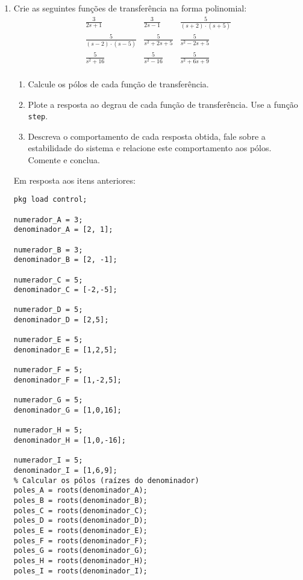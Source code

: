 \documentclass[a4paper,12pt]{article}
\begin{document}
    \begin{enumerate}
        \item Crie as seguintes funções de transferência na forma polinomial:
        \[
            \begin{array}{ccc}
                \frac{3}{2s + 1} & \frac{3}{2s - 1} & \frac{5}{(s + 2) \cdot (s + 5)} \\
                \frac{5}{(s - 2) \cdot (s - 5)} & \frac{5}{s^2 + 2s + 5} & \frac{5}{s^2 - 2s + 5} \\
                \frac{5}{s^2 + 16} & \frac{5}{s^2 - 16} & \frac{5}{s^2 + 6s + 9} \\
            \end{array}
        \]

        \begin{enumerate}
            \item Calcule os pólos de cada função de transferência.
            \item Plote a resposta ao degrau de cada função de transferência. Use a função \texttt{step}.
            \item Descreva o comportamento de cada resposta obtida, fale sobre a estabilidade do sistema e relacione este comportamento aos pólos. Comente e conclua.
        \end{enumerate}
        Em resposta aos itens anteriores:
        \vspace{0.5cm}
        \begin{lstlisting}
pkg load control;

numerador_A = 3;
denominador_A = [2, 1];

numerador_B = 3;
denominador_B = [2, -1];

numerador_C = 5;
denominador_C = [-2,-5];

numerador_D = 5;
denominador_D = [2,5];

numerador_E = 5;
denominador_E = [1,2,5];

numerador_F = 5;
denominador_F = [1,-2,5];

numerador_G = 5;
denominador_G = [1,0,16];

numerador_H = 5;
denominador_H = [1,0,-16];

numerador_I = 5;
denominador_I = [1,6,9];
% Calcular os pólos (raízes do denominador)
poles_A = roots(denominador_A);
poles_B = roots(denominador_B);
poles_C = roots(denominador_C);
poles_D = roots(denominador_D);
poles_E = roots(denominador_E);
poles_F = roots(denominador_F);
poles_G = roots(denominador_G);
poles_H = roots(denominador_H);
poles_I = roots(denominador_I);


\end{lstlisting}
\end{enumerate}
\end{document}
